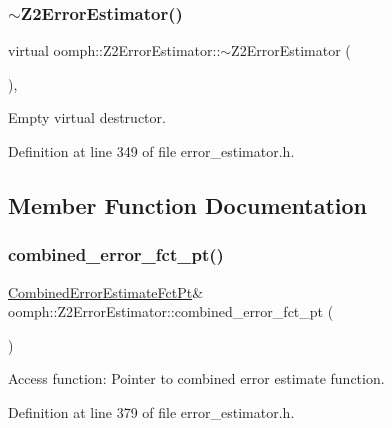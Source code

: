 \subsubsection{\texorpdfstring{$\sim$\+Z2\+Error\+Estimator()}{~Z2ErrorEstimator()}}
{\footnotesize\ttfamily virtual oomph\+::\+Z2\+Error\+Estimator\+::$\sim$\+Z2\+Error\+Estimator (\begin{DoxyParamCaption}{ }\end{DoxyParamCaption})\hspace{0.3cm}{\ttfamily [inline]}, {\ttfamily [virtual]}}



Empty virtual destructor. 



Definition at line 349 of file error\+\_\+estimator.\+h.



\subsection{Member Function Documentation}
\mbox{\label{classoomph_1_1Z2ErrorEstimator_a1719ff79e67f2f0b2b8194a91f52d3d2}} 
\subsubsection{\texorpdfstring{combined\+\_\+error\+\_\+fct\+\_\+pt()}{combined\_error\_fct\_pt()}\hspace{0.1cm}{\footnotesize\ttfamily [1/2]}}
{\footnotesize\ttfamily \hyperlink{classoomph_1_1Z2ErrorEstimator_a75ef55e67b21ec49ed1a37d095cfa9f9}{Combined\+Error\+Estimate\+Fct\+Pt}\& oomph\+::\+Z2\+Error\+Estimator\+::combined\+\_\+error\+\_\+fct\+\_\+pt (\begin{DoxyParamCaption}{ }\end{DoxyParamCaption})\hspace{0.3cm}{\ttfamily [inline]}}



Access function\+: Pointer to combined error estimate function. 



Definition at line 379 of file error\+\_\+estimator.\+h.

